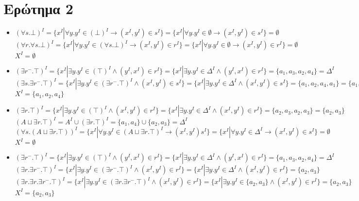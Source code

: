 \documentclass[10pt]{article}
\begin{document}
\section*{Ερώτημα 2}
\begin{itemize}
\item $(\forall s. \bot)^I = \{x^I |\forall y. y^I \in (\bot)^I \rightarrow (x^I, y^I) \in s^I\} = \{x^I |\forall y. y^I \in \emptyset \rightarrow (x^I, y^I) \in s^I\} = \emptyset$
\\
$(\forall r.\forall s. \bot)^I = \{x^I |\forall y. y^I \in (\forall s. \bot)^I \rightarrow (x^I, y^I) \in r^I\} = \{x^I |\forall y. y^I \in \emptyset \rightarrow (x^I, y^I) \in r^I\} = \emptyset$
\\
$X^I = \emptyset$

\item $(\exists r^{-}.\top)^I = \{x^I|\exists y. y^I \in (\top)^I \land (y^I, x^I) \in r^I\} = \{x^I|\exists y. y^I \in \Delta^I \land (y^I, x^I) \in r^I\} = \{a_1, a_3, a_2, a_4\} = \Delta^I$
\\
$(\exists s.\exists r^{-}.\top)^I = \{x^I|\exists y. y^I \in (\exists r^{-}.\top)^I \land (x^I, y^I) \in s^I\} = \{x^I|\exists y. y^I \in \Delta^I \land (x^I, y^I) \in s^I\} = \{a_1, a_2, a_4, a_1\} = \{a_1, a_2, a_4\}$
\\
$X^I = \{a_1, a_2, a_4\}$

\item $(\exists r.\top)^I = \{x^I |\exists y. y^I \in (\top)^I \land (x^I, y^I) \in r^I\} = \{x^I |\exists y. y^I \in \Delta^I \land (x^I, y^I) \in r^I\} = \{a_2, a_3, a_2, a_3\} = \{a_2, a_3\}$
\\
$(A \sqcup \exists r.\top)^I = A^I \cup (\exists r.\top)^I = \{a_1, a_4\} \cup \{a_2, a_3\} = \Delta^I$
\\
$(\forall s.(A \sqcup \exists r.\top))^I = \{x^I |\forall y. y^I \in (A \sqcup \exists r.\top)^I \rightarrow (x^I, y^I)  s^I\} = \{x^I |\forall y. y^I \in \Delta^I \rightarrow (x^I, y^I) \in s^I\} = \emptyset$
\\
$X^I = \emptyset$

\item $(\exists r^{-}.\top)^I = \{x^I|\exists y. y^I \in (\top)^I \land (y^I, x^I) \in r^I\} = \{x^I|\exists y. y^I \in \Delta^I \land (y^I, x^I) \in r^I\} = \{a_1, a_3, a_2, a_4\} = \Delta^I$
\\
$(\exists r.\exists r^{-}.\top)^I = \{x^I|\exists y. y^I \in (\exists r^{-}.\top)^I \land (x^I, y^I) \in r^I\} = \{x^I|\exists y. y^I \in \Delta^I \land (x^I, y^I) \in r^I\} = \{a_2, a_3\}$
\\
$(\exists r.\exists r.\exists r^{-}.\top)^I = \{x^I|\exists y. y^I \in (\exists r.\exists r^{-}.\top)^I \land (x^I, y^I) \in r^I\} = \{x^I|\exists y. y^I \in \{a_2, a_3\} \land (x^I, y^I) \in r^I\} = \{a_2, a_3\}$
\\
$X^I = \{a_2, a_3\}$
\end{itemize}
\end{document}
